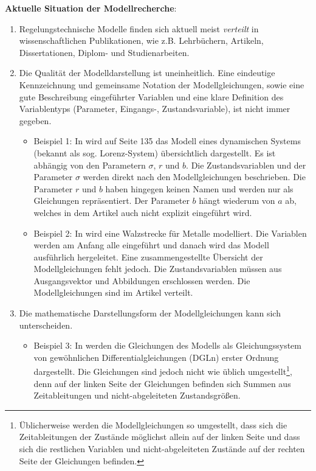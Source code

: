 \textbf{Aktuelle Situation der Modellrecherche}: 
\begin{enumerate}
	\item Regelungstechnische Modelle finden sich aktuell meist \textit{verteilt} in wissenschaftlichen Publikationen, wie z.B. Lehrbüchern, Artikeln, Dissertationen, Diplom- und Studienarbeiten.
	\item Die Qualität der Modelldarstellung ist uneinheitlich. Eine eindeutige Kennzeichnung und gemeinsame Notation der Modellgleichungen, sowie eine gute Beschreibung eingeführter Variablen und eine klare Definition des Variablentyps (Parameter, Eingangs-, Zustandsvariable), ist nicht immer gegeben.
	\begin{itemize}[label=$\bullet$]
		\item Beispiel 1: In \cite{LOR63} wird auf Seite 135 das Modell eines dynamischen Systems (bekannt als sog. \glqq Lorenz-System\grqq) übersichtlich dargestellt. Es ist abhängig von den Parametern $\sigma$, $r$ und $b$. Die Zustandsvariablen und der Parameter $\sigma$ werden direkt nach den Modellgleichungen beschrieben. Die Parameter $r$ und $b$ haben hingegen keinen Namen und werden nur als Gleichungen repräsentiert. Der Parameter $b$ hängt wiederum von $a$ ab, welches in dem Artikel auch nicht explizit eingeführt wird.
		\item Beispiel 2: In \cite{YIFREA09} wird eine Walzstrecke für Metalle modelliert. Die Variablen werden am Anfang alle eingeführt und danach wird das Modell ausführlich hergeleitet. Eine zusammengestellte Übersicht der Modellgleichungen fehlt jedoch. Die Zustandsvariablen müssen aus Ausgangsvektor und Abbildungen erschlossen werden. Die Modellgleichungen sind im Artikel verteilt.
	\end{itemize}
	\item Die mathematische Darstellungsform der Modellgleichungen kann sich unterscheiden.
	\begin{itemize}[label=$\bullet$]
		\item Beispiel 3: In \cite[Seite 14]{SILEEA12} werden die Gleichungen des Modells als Gleichungssystem von gewöhnlichen Differentialgleichungen (DGLn) erster Ordnung dargestellt. Die Gleichungen sind jedoch nicht wie üblich umgestellt\footnote{Üblicherweise werden die Modellgleichungen so umgestellt, dass sich die Zeitableitungen der Zustände möglichst allein auf der linken Seite und dass sich die restlichen Variablen und nicht-abgeleiteten Zustände auf der rechten Seite der Gleichungen befinden.}, denn auf der linken Seite der Gleichungen befinden sich Summen aus Zeitableitungen und nicht-abgeleiteten Zustandsgrößen.

\end{itemize}
\end{enumerate}
